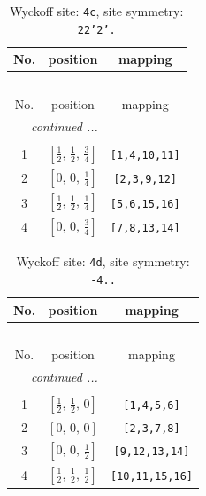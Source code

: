 \documentclass[fleqn,8pt]{jsarticle}
\begin{document}
\renewcommand{\arraystretch}{1.2}
\begin{longtable}{ccc}
\caption{Wyckoff site: {\tt 4c}, site symmetry: {\tt 22'2'.}}
 \\
 \hline \hline
No. & position & mapping \\ \hline \endfirsthead

\multicolumn{2}{l}{\tablename\ \thetable{}} \\
 \hline \hline
No. & position & mapping \\ \hline \endhead

 \hline \hline
\multicolumn{2}{r}{\footnotesize\it continued ...} \\ \endfoot

 \hline \hline
\multicolumn{2}{r}{} \\ \endlastfoot

1 & $\left[ \frac{1}{2},\, \frac{1}{2},\, \frac{3}{4} \right]$ & {\tt [1,4,10,11]} \\ \hline
2 & $\left[ 0,\, 0,\, \frac{1}{4} \right]$ & {\tt [2,3,9,12]} \\ \hline
3 & $\left[ \frac{1}{2},\, \frac{1}{2},\, \frac{1}{4} \right]$ & {\tt [5,6,15,16]} \\ \hline
4 & $\left[ 0,\, 0,\, \frac{3}{4} \right]$ & {\tt [7,8,13,14]} \\
\end{longtable}
\renewcommand{\arraystretch}{1.2}
\begin{longtable}{ccc}
\caption{Wyckoff site: {\tt 4d}, site symmetry: {\tt -4..}}
 \\
 \hline \hline
No. & position & mapping \\ \hline \endfirsthead

\multicolumn{2}{l}{\tablename\ \thetable{}} \\
 \hline \hline
No. & position & mapping \\ \hline \endhead

 \hline \hline
\multicolumn{2}{r}{\footnotesize\it continued ...} \\ \endfoot

 \hline \hline
\multicolumn{2}{r}{} \\ \endlastfoot

1 & $\left[ \frac{1}{2},\, \frac{1}{2},\, 0 \right]$ & {\tt [1,4,5,6]} \\ \hline
2 & $\left[ 0,\, 0,\, 0 \right]$ & {\tt [2,3,7,8]} \\ \hline
3 & $\left[ 0,\, 0,\, \frac{1}{2} \right]$ & {\tt [9,12,13,14]} \\ \hline
4 & $\left[ \frac{1}{2},\, \frac{1}{2},\, \frac{1}{2} \right]$ & {\tt [10,11,15,16]} \\
\end{longtable}
\end{document}
